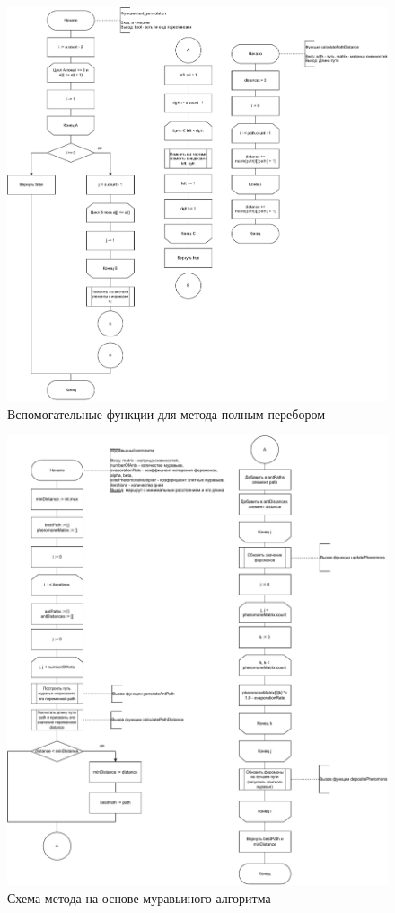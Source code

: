 \begin{figure}[h]
	\centering
	\includegraphics[width=1\linewidth]{img/calculatepath.pdf}
	\caption{Вспомогательные функции для метода полным перебором}
	\label{img:calculatepath}
\end{figure}

\begin{figure}[h]
	\centering
	\includegraphics[width=1\linewidth]{img/ant1.pdf}
	\caption{Схема метода на основе муравьиного алгоритма}
	\label{img:ant1}
\end{figure}

